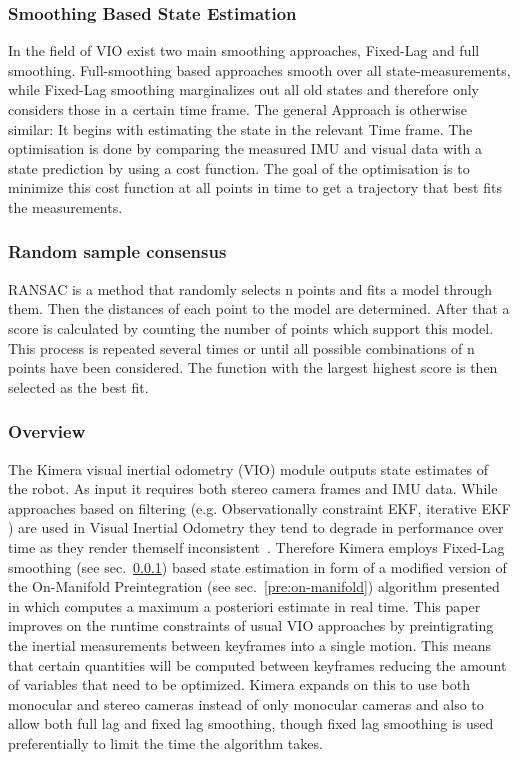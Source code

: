 \documentclass[11pt,a4paper]{article}
\begin{document}
\subsubsection{Smoothing Based State Estimation} \label{Pre:Smoothing}
In the field of VIO exist two main smoothing approaches, Fixed-Lag and full smoothing.
Full-smoothing based approaches smooth over all state-measurements, while Fixed-Lag smoothing marginalizes out all old states and therefore only considers those in a certain time frame.
The general Approach is otherwise similar: It begins with estimating the state in the relevant Time frame.
The optimisation is done by comparing the measured IMU and visual data with a state prediction by using a cost function. 
The goal of the optimisation is to minimize this cost function at all points in time to get a trajectory that best fits the measurements.

\subsubsection{Random sample consensus} \label{sec:RANSAC}
RANSAC is a method that randomly selects n points and fits a model through them.
Then the distances of each point to the model are determined. 
After that a score is calculated by counting the number of points which support this model.
This process is repeated several times or until all possible combinations of n points have been considered. 
The function with the largest highest score is then selected as the best fit.

\subsubsection{Overview} \label{Sec:K-VIO overview}
The Kimera visual inertial odometry (VIO) module outputs state estimates of the robot.
As input it requires both stereo camera frames and IMU data. 
While approaches based on filtering (e.g. Observationally constraint EKF, iterative EKF ) are used in Visual Inertial Odometry they tend to degrade in performance over time as they render themself inconsistent~\cite{Forster_2017}. 
Therefore Kimera employs Fixed-Lag smoothing (see sec.~\ref{Pre:Smoothing}) based state estimation in form of  a modified version of the On-Manifold Preintegration (see sec.~\ref{pre:on-manifold}) algorithm presented in \cite{Forster_2017} which computes a maximum a posteriori estimate in real time. 
This paper improves on the runtime constraints of usual VIO approaches by preintigrating the inertial measurements between keyframes into a single motion. 
This means that certain quantities will be computed between keyframes reducing the amount of variables that need to be optimized. 
Kimera expands on this to use both monocular and stereo cameras instead of only monocular cameras and also to allow both full lag and fixed lag smoothing, though fixed lag smoothing is used preferentially to limit the time the algorithm takes.
\end{document}
